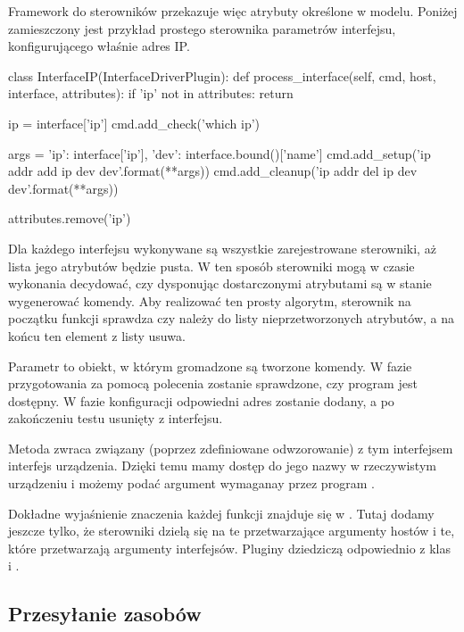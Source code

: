 \documentclass[00-praca-magisterska.tex]{subfiles}
\begin{document}
Framework do sterowników przekazuje więc atrybuty określone w modelu. Poniżej
zamieszczony jest przykład prostego sterownika parametrów interfejsu,
konfigurującego właśnie adres IP.

\begin{pythoncode}
  class InterfaceIP(InterfaceDriverPlugin):
      def process_interface(self, cmd, host, interface, attributes):
          if 'ip' not in attributes:
              return
  
          ip = interface['ip']
          cmd.add_check('which ip')
  
          args = {'ip': interface['ip'],
                  'dev': interface.bound()['name']}
          cmd.add_setup('ip addr add {ip} dev {dev}'.format(**args))
          cmd.add_cleanup('ip addr del {ip} dev {dev}'.format(**args))
  
          attributes.remove('ip')

\end{pythoncode}

Dla każdego interfejsu wykonywane są wszystkie zarejestrowane sterowniki, aż
lista jego atrybutów będzie pusta. W ten sposób sterowniki mogą w czasie
wykonania decydować, czy dysponując dostarczonymi atrybutami są w stanie
wygenerować komendy. Aby realizować ten prosty algorytm, sterownik na początku
funkcji  sprawdza czy  należy do listy
nieprzetworzonych atrybutów, a na końcu ten element z listy usuwa.

Parametr  to obiekt, w którym gromadzone są tworzone komendy. W fazie
przygotowania za pomocą polecenia  zostanie sprawdzone, czy program
 jest dostępny. W fazie konfiguracji odpowiedni adres zostanie dodany,
a po zakończeniu testu usunięty z interfejsu.

Metoda  zwraca związany (poprzez zdefiniowane
odwzorowanie) z tym interfejsem interfejs urządzenia. Dzięki temu mamy dostęp do
jego nazwy w rzeczywistym urządzeniu i możemy podać argument wymaganay przez
program .

Dokładne wyjaśnienie znaczenia każdej funkcji znajduje się w . Tutaj dodamy jeszcze tylko, że sterowniki dzielą się na te
przetwarzające argumenty hostów i te, które przetwarzają argumenty interfejsów.
Pluginy dziedziczą odpowiednio z klas  i
.

\subsection{Przesyłanie zasobów}
\end{document}
